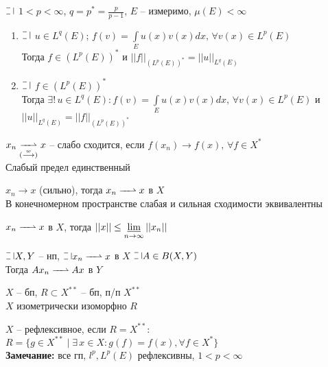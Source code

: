 \begin{theorem}[Рисса 3]
  $\letus$ $1 < p < \infty$, $q = p^* = \frac{p}{p-1}$, $E$ -- измеримо, $\mu(E) < \infty$ 
  \begin{enumerate}
    \item $\letus$ $u \in L^q(E); \, f(v) = \int\limits_{E} u(x) v(x) dx, \, \forall v(x) \in L^p(E)$\\
    Тогда $f \in (L^p(E))^*$ и $||f||_{(L^p(E))^*} = ||u||_{L^q(E)}$
    \item $\letus$ $f \in (L^p(E))^*$\\
    Тогда $\exists! \, u \in L^q(E): f(v) = \int\limits_{E} u(x) v(x) dx, \, \forall v(x) \in L^p(E)$ и $||u||_{L^q(E)} = ||f||_{(L^p(E))^*}$
  \end{enumerate}
\end{theorem}
    
\begin{definition}
  $x_n \underset{(\overset{w}{\longrightarrow})}{\weakconv} x$ -- слабо сходится, если $f(x_n) \longrightarrow f(x), \, \forall f \in X^*$ \\
  Слабый предел единственный
\end{definition}

\begin{utv}[2]
	$x_n \rightarrow x$ (сильно), тогда $x_n \weakconv x$ в $X$ \\
	В конечномерном пространстве слабая и сильная сходимости эквивалентны
\end{utv}

\begin{utv}
	$x_n \weakconv x$ в $X$, тогда $||x||\le \varliminf\limits_{n\rightarrow\infty} ||x_n||$
\end{utv}

\begin{utv}
	$\letus X, Y$ -- нп, $\letus x_n \weakconv x$ в $X$ $\letus A \in B(X, Y)$ \\
	Тогда $A x_n \weakconv A x$ в $Y$
\end{utv}

\begin{theorem}
	$X$ -- бп, $R \subset X^{**}$ -- бп, п/п $X^{**}$ \\
	$X$ изометрически изоморфно $R$
\end{theorem}

\begin{definition}
  $X$ -- рефлексивное, если $R = X^{**}$:\\
  $R = \{g \in X^{**} \mid \exists \, x \in X: g(f) = f(x), \forall f \in X^* \}$ \\
  {\bf Замечание:} все гп, $l^p, L^p(E)$ рефлексивны, $1<p<\infty$
\end{definition}

